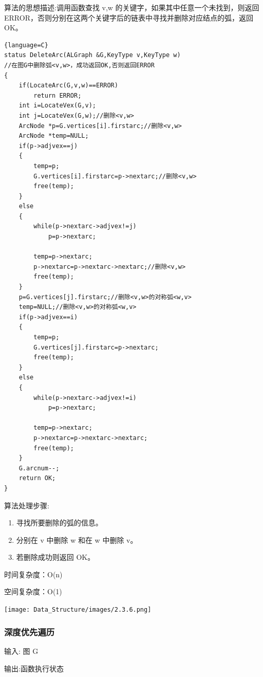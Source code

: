 \documentclass[supercite]{Experimental_Report}
\theoremstyle{definition}
\begin{document}
算法的思想描述:调用函数查找 v,w 的关键字，如果其中任意一个未找到，则返回 ERROR，否则分别在这两个关键字后的链表中寻找并删除对应结点的弧，返回 OK。	
\begin{lstlisting}{language=C}
status DeleteArc(ALGraph &G,KeyType v,KeyType w)
//在图G中删除弧<v,w>，成功返回OK,否则返回ERROR
{
    if(LocateArc(G,v,w)==ERROR) 
        return ERROR;
    int i=LocateVex(G,v);
    int j=LocateVex(G,w);//删除<v,w>
    ArcNode *p=G.vertices[i].firstarc;//删除<v,w>
    ArcNode *temp=NULL;
    if(p->adjvex==j)
    {
        temp=p;
        G.vertices[i].firstarc=p->nextarc;//删除<v,w>
        free(temp);
    }
    else 
    {
        while(p->nextarc->adjvex!=j)
            p=p->nextarc;
        
        temp=p->nextarc;
        p->nextarc=p->nextarc->nextarc;//删除<v,w>
        free(temp);
    }
    p=G.vertices[j].firstarc;//删除<v,w>的对称弧<w,v>
    temp=NULL;//删除<v,w>的对称弧<w,v>
    if(p->adjvex==i)
    {
        temp=p;
        G.vertices[j].firstarc=p->nextarc;
        free(temp);
    }
    else 
    {
        while(p->nextarc->adjvex!=i)
            p=p->nextarc;

        temp=p->nextarc;
        p->nextarc=p->nextarc->nextarc;
        free(temp);
    }
    G.arcnum--;
    return OK;
}
\end{lstlisting}
算法处理步骤:
\begin{enumerate}
	\renewcommand{\labelenumi}{\theenumi)}
	\item 寻找所要删除的弧的信息。
	\item 分别在 v 中删除 w 和在 w 中删除 v。
	\item 若删除成功则返回 OK。
\end{enumerate}

时间复杂度：O(n)

空间复杂度：O(1)


\texttt{[image: Data\_Structure/images/2.3.6.png]}
\vspace{-0.2cm}
\subsubsection{深度优先遍历}
输入: 图 G

输出:函数执行状态
\end{document}

